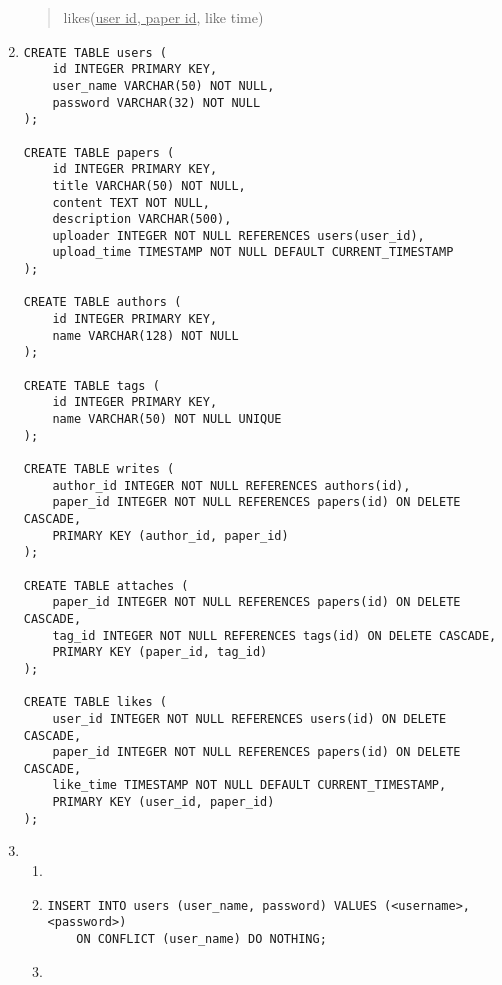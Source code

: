 \documentclass{article}
\begin{document}
\begin{enumerate}
\begin{quote}
        likes(\underline{user id, paper id}, like time)
    \end{quote}

    \item \begin{verbatim}
CREATE TABLE users (
    id INTEGER PRIMARY KEY,
    user_name VARCHAR(50) NOT NULL,
    password VARCHAR(32) NOT NULL
);

CREATE TABLE papers (
    id INTEGER PRIMARY KEY,
    title VARCHAR(50) NOT NULL,
    content TEXT NOT NULL,
    description VARCHAR(500),
    uploader INTEGER NOT NULL REFERENCES users(user_id),
    upload_time TIMESTAMP NOT NULL DEFAULT CURRENT_TIMESTAMP
);

CREATE TABLE authors (
    id INTEGER PRIMARY KEY,
    name VARCHAR(128) NOT NULL
);

CREATE TABLE tags (
    id INTEGER PRIMARY KEY,
    name VARCHAR(50) NOT NULL UNIQUE
);

CREATE TABLE writes (
    author_id INTEGER NOT NULL REFERENCES authors(id),
    paper_id INTEGER NOT NULL REFERENCES papers(id) ON DELETE CASCADE,
    PRIMARY KEY (author_id, paper_id)
);

CREATE TABLE attaches (
    paper_id INTEGER NOT NULL REFERENCES papers(id) ON DELETE CASCADE,
    tag_id INTEGER NOT NULL REFERENCES tags(id) ON DELETE CASCADE,
    PRIMARY KEY (paper_id, tag_id)
);

CREATE TABLE likes (
    user_id INTEGER NOT NULL REFERENCES users(id) ON DELETE CASCADE,
    paper_id INTEGER NOT NULL REFERENCES papers(id) ON DELETE CASCADE,
    like_time TIMESTAMP NOT NULL DEFAULT CURRENT_TIMESTAMP,
    PRIMARY KEY (user_id, paper_id)
);
\end{verbatim}

    \item \begin{enumerate}
        \item {}
        
        \item \begin{verbatim}
INSERT INTO users (user_name, password) VALUES (<username>, <password>)
    ON CONFLICT (user_name) DO NOTHING;
\end{verbatim}

        \item {}
        

\end{enumerate}
\end{enumerate}
\end{document}
